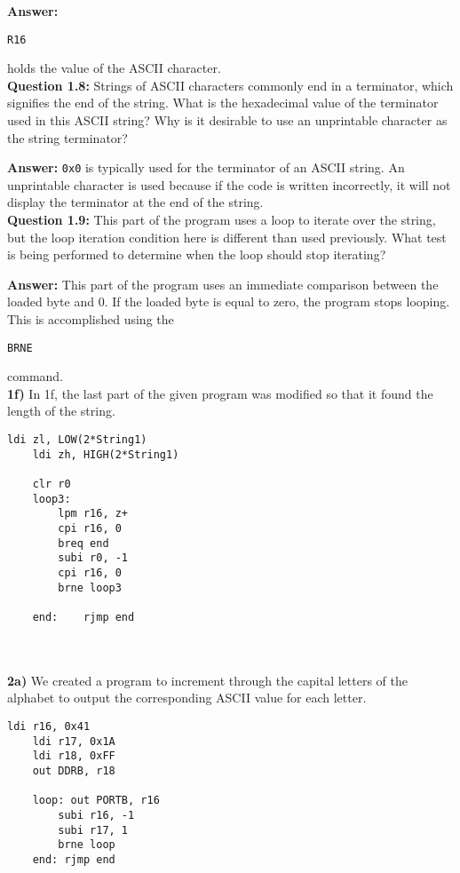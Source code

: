 \documentclass[titlepage, 12pt]{article}
\newcommand{\ttt}[1]{\begin{small}\texttt{#1}\end{small}}
\newcommand{\hi}{\hangindent=0.5in}
\begin{document}
	\hi \textbf{Answer:} \ttt{R16} holds the value of the ASCII character.\\
	
	\hi \textbf{Question 1.8:} Strings of ASCII characters commonly end in a terminator, which signifies the end of the string. What is the hexadecimal value of the terminator used in this ASCII string? Why is it desirable to use an unprintable character as the string terminator?
	
	\hi \textbf{Answer:} \texttt{0x0} is typically used for the terminator of an ASCII string. An unprintable character is used because if the code is written incorrectly, it will not display the terminator at the end of the string.\\
	
	\hi \textbf{Question 1.9:} This part of the program uses a loop to iterate over the string, but the loop iteration condition here is different than used previously. What test is being performed to determine when the loop should stop iterating?
	
	\hi \textbf{Answer:} This part of the program uses an immediate comparison between the loaded byte and 0. If the loaded byte is equal to zero, the program stops looping. This is accomplished using the \ttt{BRNE} command.\\
	
	\noindent\textbf{1f)} In 1f, the last part of the given program was modified so that it found the length of the string.
	
	\begin{lstlisting}[style=AVR]
	ldi zl, LOW(2*String1)
	ldi zh, HIGH(2*String1)
	
	clr r0
	loop3:
		lpm r16, z+
		cpi r16, 0
		breq end
		subi r0, -1
		cpi r16, 0
		brne loop3
	
	end:	rjmp end
	\end{lstlisting}~\\\\
	
	
	\noindent\textbf{2a)} We created a program to increment through the capital letters of the alphabet to output the corresponding ASCII value for each letter.
	
	\begin{lstlisting}[style=AVR]
	ldi r16, 0x41 
	ldi r17, 0x1A 
	ldi r18, 0xFF 
	out DDRB, r18 
	
	loop: out PORTB, r16 
		subi r16, -1 
		subi r17, 1 
		brne loop 
	end: rjmp end 
	\end{lstlisting}~\\
	
\end{document}
